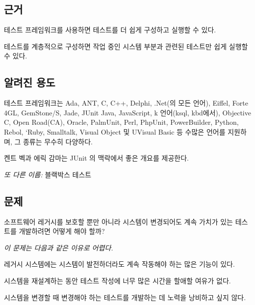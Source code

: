 \documentclass[a4paper,10pt,twoside]{book}
\begin{document}
\subsection*{근거}

테스트 프레임워크를 사용하면 테스트를 더 쉽게 구성하고 실행할 수 있다. 

테스트를 계층적으로 구성하면 작업 중인 시스템 부분과 관련된 테스트만 쉽게 실행할 수 있다.

\subsection*{알려진 용도}

테스트 프레임워크는 Ada, ANT, C, C++, Delphi, .Net(의 모든 언어), Eiffel, Forte 4GL, GemStone/S, Jade, JUnit Java, JavaScript, k 언어(ksql, kbd에서), Objective C, Open Road(CA), Oracle, PalmUnit, Perl, PhpUnit, PowerBuilder, Python, Rebol, `Ruby, Smalltalk, Visual Object 및 UVisual Basic 등 수많은 언어를 지원하며, 그 종류는 무수히 다양하다.

켄트 벡과 에릭 감마는 JUnit \cite{Beck98a}의 맥락에서 좋은 개요를 제공한다.


\emph{또 다른 이름:} 블랙박스 테스트\cite{Pres94a}


\subsection*{문제}

소프트웨어 레거시를 보호할 뿐만 아니라 시스템이 변경되어도 계속 가치가 있는 테스트를 개발하려면 어떻게 해야 할까?

\emph{이 문제는 다음과 같은 이유로 어렵다.}

\begin{bulletlist}
\item 레거시 시스템에는 시스템이 발전하더라도 계속 작동해야 하는 많은 기능이 있다.
\item 시스템을 재설계하는 동안 테스트 작성에 너무 많은 시간을 할애할 여유가 없다.
\item 시스템을 변경할 때 변경해야 하는 테스트를 개발하는 데 노력을 낭비하고 싶지 않다.
\end{bulletlist}
\end{document}
